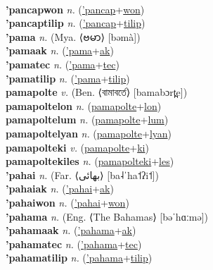  \label{'pancapak} \\
\textbf{'pancapwon} \textit{n.} (\hyperref['pancap]{'pancap}+\hyperref[won]{won})
 \label{'pancapwon} \\
\textbf{'pancaptilip} \textit{n.} (\hyperref['pancap]{'pancap}+\hyperref[tilip]{tilip})
 \label{'pancaptilip} \\
\textbf{'pama} \textit{n.} (Mya. ⟨ဗမာ⟩ [bəmà])
 \label{'pama} \\
\textbf{'pamaak} \textit{n.} (\hyperref['pama]{'pama}+\hyperref[ak]{ak})
 \label{'pamaak} \\
\textbf{'pamatec} \textit{n.} (\hyperref['pama]{'pama}+\hyperref[tec]{tec})
 \label{'pamatec} \\
\textbf{'pamatilip} \textit{n.} (\hyperref['pama]{'pama}+\hyperref[tilip]{tilip})
 \label{'pamatilip} \\
\textbf{pamapolte} \textit{v.} (Ben. ⟨বামাবর্তে⟩ [bamabɔrt̪e])
 \label{pamapolte} \\
\textbf{pamapoltelon} \textit{n.} (\hyperref[pamapolte]{pamapolte}+\hyperref[lon]{lon})
 \label{pamapoltelon} \\
\textbf{pamapoltelum} \textit{n.} (\hyperref[pamapolte]{pamapolte}+\hyperref[lum]{lum})
 \label{pamapoltelum} \\
\textbf{pamapoltelyan} \textit{n.} (\hyperref[pamapolte]{pamapolte}+\hyperref[lyan]{lyan})
 \label{pamapoltelyan} \\
\textbf{pamapolteki} \textit{v.} (\hyperref[pamapolte]{pamapolte}+\hyperref[ki]{ki})
 \label{pamapolteki} \\
\textbf{pamapoltekiles} \textit{n.} (\hyperref[pamapolteki]{pamapolteki}+\hyperref[les]{les})
 \label{pamapoltekiles} \\
\textbf{'pahai} \textit{n.} (Far. ⟨بهائی‎⟩ [ba˨ˈha˦ʔi˦])
 \label{'pahai} \\
\textbf{'pahaiak} \textit{n.} (\hyperref['pahai]{'pahai}+\hyperref[ak]{ak})
 \label{'pahaiak} \\
\textbf{'pahaiwon} \textit{n.} (\hyperref['pahai]{'pahai}+\hyperref[won]{won})
 \label{'pahaiwon} \\
\textbf{'pahama} \textit{n.} (Eng. ⟨The Bahamas⟩ [bəˈhɑːmə])
 \label{'pahama} \\
\textbf{'pahamaak} \textit{n.} (\hyperref['pahama]{'pahama}+\hyperref[ak]{ak})
 \label{'pahamaak} \\
\textbf{'pahamatec} \textit{n.} (\hyperref['pahama]{'pahama}+\hyperref[tec]{tec})
 \label{'pahamatec} \\
\textbf{'pahamatilip} \textit{n.} (\hyperref['pahama]{'pahama}+\hyperref[tilip]{tilip})
